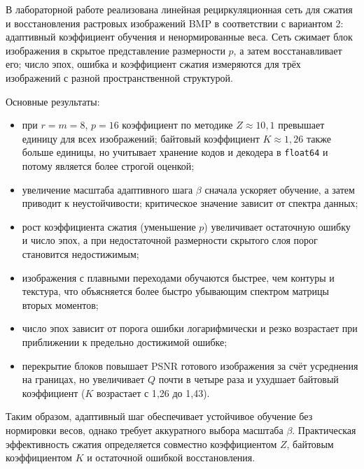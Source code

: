 
В лабораторной работе реализована линейная рециркуляционная сеть для сжатия и восстановления растровых изображений BMP в соответствии с вариантом 2: адаптивный коэффициент обучения и ненормированные веса. Сеть сжимает блок изображения в скрытое представление размерности $p$, а затем восстанавливает его; число эпох, ошибка и коэффициент сжатия измеряются для трёх изображений с разной пространственной структурой.

Основные результаты:
\begin{itemize}
	\item при $r=m=8$, $p=16$ коэффициент по методике $Z\approx10{,}1$ превышает единицу для всех изображений; байтовый коэффициент $K\approx1{,}26$ также больше единицы, но учитывает хранение кодов и декодера в \texttt{float64} и потому является более строгой оценкой;
	\item увеличение масштаба адаптивного шага $\beta$ сначала ускоряет обучение, а затем приводит к неустойчивости; критическое значение зависит от спектра данных;
	\item рост коэффициента сжатия (уменьшение $p$) увеличивает остаточную ошибку и число эпох, а при недостаточной размерности скрытого слоя порог становится недостижимым;
	\item изображения с плавными переходами обучаются быстрее, чем контуры и текстура, что объясняется более быстро убывающим спектром матрицы вторых моментов;
	\item число эпох зависит от порога ошибки логарифмически и резко возрастает при приближении к предельно достижимой ошибке;
	\item перекрытие блоков повышает PSNR готового изображения за счёт усреднения на границах, но увеличивает $Q$ почти в четыре раза и ухудшает байтовый коэффициент ($K$ возрастает с 1{,}26 до 1{,}43).
\end{itemize}

Таким образом, адаптивный шаг обеспечивает устойчивое обучение без нормировки весов, однако требует аккуратного выбора масштаба $\beta$. Практическая эффективность сжатия определяется совместно коэффициентом $Z$, байтовым коэффициентом $K$ и остаточной ошибкой восстановления.

